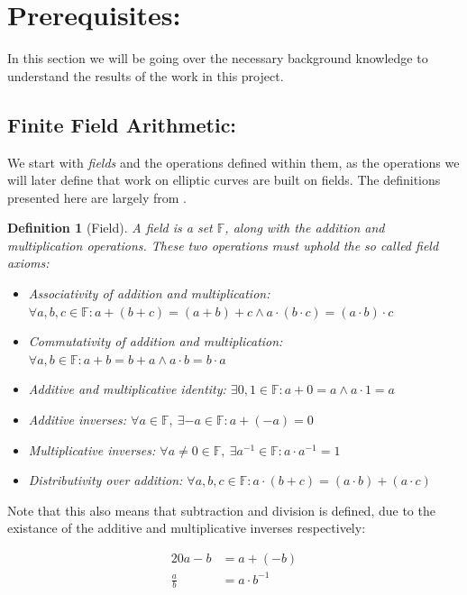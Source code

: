 \documentclass{article}
\newtheorem{definition}{Definition}[section]
\newcommand{\eq}[1]{\begin{alignat*}{20}#1\end{alignat*}}
\newcommand{\F}{\mathbb{F}}
\begin{document}
\section{Prerequisites:}

In this section we will be going over the necessary background knowledge
to understand the results of the work in this project.

\subsection{Finite Field Arithmetic:} \label{Finite Field Arithmetic}

We start with \textit{fields} and the operations defined within
them, as the operations we will later define that work on elliptic
curves are built on fields. The definitions presented here are largely
from \cite{elliptic-curves}.

\begin{definition}[Field]
	A field is a set $\F$, along with the \textit{addition} and
	\textit{multiplication} operations. These two operations must
	uphold the so called \textit{field axioms}:

	\begin{itemize}
		\item Associativity of addition and multiplication:
		$\forall a,b,c \in \F : a + (b + c) = (a + b) + c \land a \cdot (b \cdot c) = (a \cdot b) \cdot c$
		\item Commutativity of addition and multiplication:
		$\forall a,b \in \F : a+b=b+a \land a \cdot b = b \cdot a$
		\item Additive and multiplicative identity:
		$\exists 0,1 \in \F : a + 0 = a \land a \cdot 1 = a$
		\item Additive inverses:
		$\forall a \in \F,\ \exists {-a} \in \F : a + ({-a}) = 0$
		\item Multiplicative inverses:
		$\forall a \neq 0 \in \F,\  \exists a^{-1} \in \F : a \cdot a^{-1} = 1$
		\item Distributivity over addition:
		$\forall a,b,c \in \F : a \cdot (b + c) = (a \cdot b) + (a \cdot c)$
	\end{itemize}
\end{definition}

Note that this also means that subtraction and division is defined,
due to the existance of the additive and multiplicative inverses
respectively:

\eq{
	a-b         &= a + (-b) \\
	\frac{a}{b} &= a \cdot b^{-1}
}
\end{document}
